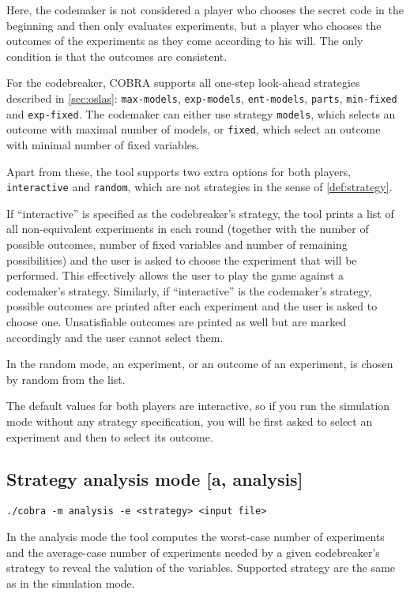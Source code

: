 Here, the codemaker is not considered a player who chooses
  the secret code in the beginning and then only evaluates experiments,
  but a player who chooses the outcomes
  of the experiments as they come according to his will.
The only condition is that the outcomes are consistent.

For the codebreaker, COBRA supports all one-step look-ahead strategies described in
\autoref{sec:oslas}: \texttt{max-models}, \texttt{exp-models},
 \texttt{ent-models}, \texttt{parts}, \texttt{min-fixed} and \texttt{exp-fixed}.
The codemaker can either use strategy \texttt{models}, which selects an outcome
  with maximal number of models, or \texttt{fixed}, which select an outcome
  with minimal number of fixed variables.

Apart from these, the tool supports two extra options for both players,
  \texttt{interactive} and \texttt{random},
  which are not strategies in the sense of \autoref{def:strategy}.

If ``interactive'' is specified as the codebreaker's strategy,
  the tool prints a list of all non-equivalent experiments in each round
  (together with the number of possible outcomes, number of fixed variables
  and number of remaining possibilities) and the user is asked
  to choose the experiment that will be performed.
This effectively allows the user to play the game against a codemaker's strategy.
Similarly, if ``interactive'' is the codemaker's strategy, possible outcomes
  are printed after each experiment and the user is asked to choose one.
Unsatisfiable outcomes are printed as well but are marked accordingly
  and the user cannot select them.

In the random mode, an experiment, or an outcome of an experiment, is
  chosen by random from the list.

The default values for both players are interactive,
  so if you run the simulation mode without any strategy specification,
  you will be first asked to select an experiment and then to select its outcome.

\subsection{Strategy analysis mode [a, analysis]}

\centerline{\texttt{./cobra -m analysis -e <strategy> <input file> }}

In the analysis mode the tool computes
  the worst-case number of experiments and
  the average-case number of experiments needed by
  a given codebreaker's strategy
  to reveal the valution of the variables.
Supported strategy are the same as in the simulation mode.

